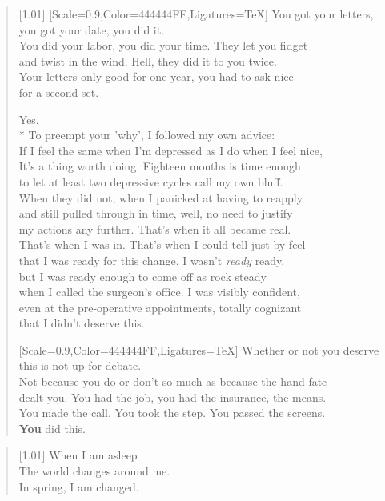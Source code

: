 \begin{verse}[1.01\textwidth]
  {[Scale=0.9,Color=444444FF,Ligatures=TeX]
  \vin You got your letters, you got your date, you did it.\\
  \vin You did your labor, you did your time. They let you fidget\\
  \vin and twist in the wind. Hell, they did it to you twice.\\
  \vin Your letters only good for one year, you had to ask nice\\
  \vin for a second set.}

  Yes.\\*
   To preempt your 'why', I followed my own advice:\\
  If I feel the same when I'm depressed as I do when I feel nice,\\
  It's a thing worth doing. Eighteen months is time enough\\
  to let at least two depressive cycles call my own bluff.\\
  When they did not, when I panicked at having to reapply\\
  and still pulled through in time, well, no need to justify\\
  my actions any further. That's when it all became real.\\
  That's when I was in. That's when I could tell just by feel\\
  that I was ready for this change. I wasn't \emph{ready} ready,\\
  but I was ready enough to come off as rock steady\\
  when I called the surgeon's office. I was visibly confident,\\
  even at the pre-operative appointments, totally cognizant\\
  that I didn't deserve this.

  {[Scale=0.9,Color=444444FF,Ligatures=TeX]
  \vin Whether or not you deserve this is not up for debate.\\
  \vin Not because you do or don't so much as because the hand fate\\
  \vin dealt you. You had the job, you had the insurance, the means.\\
  \vin You made the call. You took the step. You passed the screens.\\
  \vin \textbf{You} did this.}
\end{verse}
\newpage

\null
\vfill
\begin{verse}[1.01\textwidth]
  When I am asleep\\
  The world changes around me.\\
  In spring, I am changed.
\end{verse}
\vfill
\newpage

